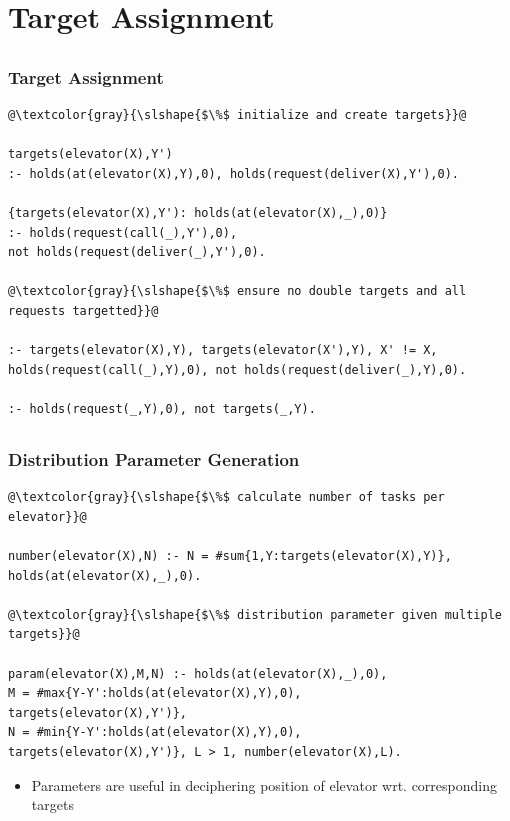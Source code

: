 \documentclass{beamer}
\begin{document}
\section{Target Assignment}
\subsection{}
\begin{frame}[fragile]
\frametitle{Target Assignment}
\begin{adjustwidth}{-1em}{-1em}
\begin{lstlisting}
@\textcolor{gray}{\slshape{$\%$ initialize and create targets}}@

targets(elevator(X),Y')
:- holds(at(elevator(X),Y),0), holds(request(deliver(X),Y'),0).

{targets(elevator(X),Y'): holds(at(elevator(X),_),0)}
:- holds(request(call(_),Y'),0), 
not holds(request(deliver(_),Y'),0).

@\textcolor{gray}{\slshape{$\%$ ensure no double targets and all requests targetted}}@

:- targets(elevator(X),Y), targets(elevator(X'),Y), X' != X, 
holds(request(call(_),Y),0), not holds(request(deliver(_),Y),0).

:- holds(request(_,Y),0), not targets(_,Y).
\end{lstlisting}
\end{adjustwidth}
\end{frame}

\subsection{}
\begin{frame}[fragile]
\frametitle{Distribution Parameter Generation}
\begin{adjustwidth}{-1em}{-1em}
\begin{lstlisting}
@\textcolor{gray}{\slshape{$\%$ calculate number of tasks per elevator}}@

number(elevator(X),N) :- N = #sum{1,Y:targets(elevator(X),Y)},
holds(at(elevator(X),_),0).

@\textcolor{gray}{\slshape{$\%$ distribution parameter given multiple targets}}@

param(elevator(X),M,N) :- holds(at(elevator(X),_),0), 
M = #max{Y-Y':holds(at(elevator(X),Y),0), 
targets(elevator(X),Y')}, 
N = #min{Y-Y':holds(at(elevator(X),Y),0), 
targets(elevator(X),Y')}, L > 1, number(elevator(X),L).
\end{lstlisting}
\begin{itemize}
    \setlength\itemsep{1em}
    \item Parameters are useful in deciphering position of elevator wrt. corresponding targets
\end{itemize}
\end{adjustwidth}
\end{frame}
\end{document}
